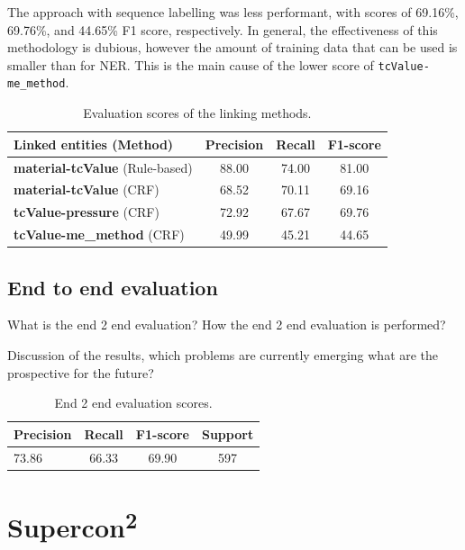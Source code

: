 \documentclass{article}
\begin{document}
The approach with sequence labelling was less performant, with scores of 69.16\%, 69.76\%, and 44.65\% F1 score, respectively. In general, the effectiveness of this methodology is dubious, however the amount of training data that can be used is smaller than for NER. 
This is the main cause of the lower score of \texttt{tcValue-me\_method}. 


\begin{table}[ht]
\centering
\begin{tabular}{lccc}
\hline \textbf{Linked entities} (Method) & \textbf{Precision} & \textbf{Recall} & \textbf{F1-score} \\ \hline
\textbf{material-tcValue} (Rule-based)  & 88.00 	&   74.00      &	81.00      \\
\textbf{material-tcValue} (CRF)         & 68.52 &	70.11   &  69.16    \\
\textbf{tcValue-pressure} (CRF)         & 72.92 &	67.67   &  69.76    \\
\textbf{tcValue-me\_method} (CRF)       & 49.99 &	45.21   &  44.65   \\
\hline
\end{tabular}
\label{table:evaluation-linking}
\caption{Evaluation scores of the linking methods. }
\end{table}

\subsection{End to end evaluation}

What is the end 2 end evaluation? 
How the end 2 end evaluation is performed? 

Discussion of the results, which problems are currently emerging what are the prospective for the future?

\begin{table}[ht]
\centering
\begin{tabular}{lccc}
\hline \textbf{Precision} & \textbf{Recall} & \textbf{F1-score} & \textbf{Support} \\ \hline
73.86  &	66.33 &	69.90 & 597\\
\hline
\end{tabular}
\label{table:end2end-evaluation}
\caption{End 2 end evaluation scores. }
\end{table}

\section{Supercon\textsuperscript{2}}
\end{document}
